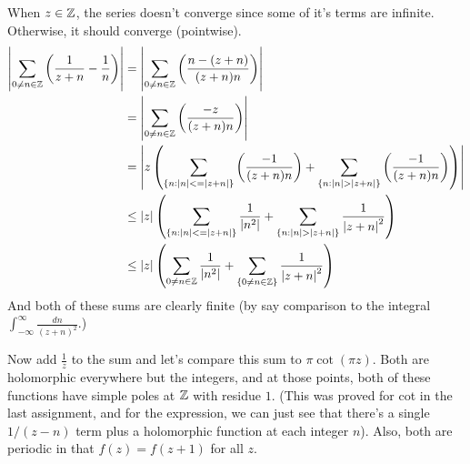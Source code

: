 \documentclass{homework}
\begin{document}
                                              \begin{solution}
                                              When $z\in \mathbb{Z}$, the series doesn't converge since some of it's terms are infinite. Otherwise, it should converge (pointwise).
                                                \begin{align*}
                                                \abs{\sum_{0 \neq n \in \Z} \left( \frac{1}{z+n} - \frac{1}{n} \right) }&= \abs{ \sum_{0 \neq n \in \Z} \left( \frac{n - (z+n)}{(z+n)n} \right) }\\
                                                &=  \abs{\sum_{0 \neq n \in \Z} \left( \frac{-z}{(z+n)n} \right)}\\
                                                &= \abs{ z\left(\sum_{\{n: |n|<=|z+n|\}} \left( \frac{-1}{(z+n)n} \right) + \sum_{\{n: |n|>|z+n|\}} \left( \frac{-1}{(z+n)n} \right)\right)}\\
                                                &\leq \abs{z}\left(\sum_{\{n: |n|<=|z+n|\}} \frac{1}{\abs{n^2}} + \sum_{\{n: |n|>|z+n|\}} \frac{1}{\abs{z+n}^2} \right)\\
                                                &\leq \abs{z}\left(\sum_{0\neq n\in \Z}  \frac{1}{\abs{n^2}}+ \sum_{\{0\neq n \in \Z\}} \frac{1}{\abs{z+n}^2} \right)
                                                  \end{align*}
                                                  And both of these sums are clearly finite (by say comparison to the integral $\int_{-\infty}^\infty \frac{dn}{(z+n)^2}$.)


                                                  Now add $\frac{1}{z}$ to the sum and let's compare this sum to $\pi\cot(\pi z)$. Both are holomorphic everywhere but the integers, and at those points, both of these functions have simple poles at $\mathbb{Z}$ with residue $1$. (This was proved for cot in the last assignment, and for the expression, we can just see that there's a single $1/(z-n)$ term plus a holomorphic function at each integer $n$). Also, both are periodic in that $f(z)=f(z+1)$ for all $z$. 


\end{solution}
\end{document}
